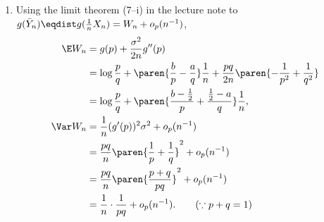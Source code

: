 \documentclass{homework}
\begin{document}
{\begin{enumerate}[label={(\roman*)}, topsep=0pt]
\begin{align*}
                  \log \frac{X_n + b}{n-X_n + a} & = \bracket{\log\frac pq + \paren{\frac bp - \frac aq}\frac 1n}
                  \\&+ \frac{\sigma}{\sqrt n} \paren{\frac 1p+ \frac 1q}\tilde Z_n + \frac{\sigma^2}{2n} \paren{-\frac 1{p^2} + \frac1{q^2}}\tilde Z_n^2 + o_p(1)
              \end{align*}
              where $\sigma^2 = pq$ and $\tilde Z_n \coloneqq \sqrt n(\frac 1n X_n - p)/\sigma$. Hence,
              \begin{align*}
                  W_n & = \bracket{\log\frac pq + \paren{\frac bp - \frac aq}\frac 1n} +\frac{\sigma}{\sqrt n} \paren{\frac 1p+ \frac 1q}\tilde Z_n + \frac{\sigma^2}{2n} \paren{-\frac 1{p^2} + \frac1{q^2}}\tilde Z_n^2
                  \\ &=  \bracket{\log\frac pq + \paren{\frac bp - \frac aq}\frac 1n}
                  \\ &\qquad\qquad+ \paren{\frac 1p+ \frac 1q} \paren{\frac 1n X_n - p} + \frac 12 \paren{-\frac 1{p^2} + \frac1{q^2}}\paren{\frac 1n X_n - p}^2
              \end{align*} could be an answer.
        \item Using the limit theorem (7--i) in the lecture note to $g(\bar Y_n)\eqdist g(\frac 1n X_n) = W_n + o_p(n^{-1})$,
              \begin{align*}
                  \E W_n   & = g(p) + \frac{\sigma^2}{2n}g''(p)
                  \\ &= \log\frac pq + \paren{\frac bp - \frac aq}\frac 1n + \frac {pq}{2n} \paren{-\frac 1{p^2} + \frac1{q^2}}
                  \\ &= \log\frac pq + \paren{\frac {b-\frac 12}p + \frac {\frac 12 - a}q}\frac 1n, \\
                  \Var W_n & = \frac 1n(g'(p))^2 \sigma^2 + o_p(n^{-1}) \\ &=  \frac{pq}{n} \paren{\frac 1p+\frac 1q}^2 + o_p(n^{-1})
                  \\ &= \frac{pq}{n} \paren{\frac{p+q}{pq}}^2 + o_p(n^{-1})
                  \\ &= \frac 1n \cdot \frac 1{pq}+ o_p(n^{-1}). \tag{$\because p+q=1$}
              \end{align*}
    \end{enumerate}
}
\end{document}
